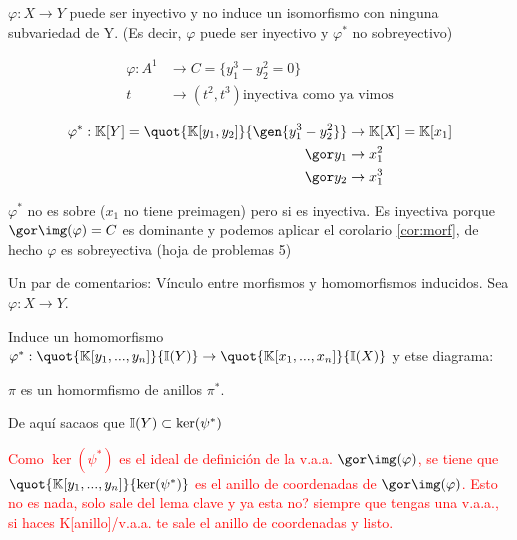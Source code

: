 \obs $\varphi: X \rightarrow Y$ puede ser inyectivo y no induce un isomorfismo con ninguna subvariedad de Y. (Es decir, $\varphi$ puede ser inyectivo y $\varphi^*$ no sobreyectivo)

\begin{example}

	\begin{align*}
		\varphi: A^1 & \rightarrow C=\{ y_1^3-y_2^2=0 \} \\
		t & \rightarrow (t^2,t^3) \text{inyectiva como ya vimos}
	\end{align*}

	\begin{align*}
		\varphi^*: \K[Y]=\quot{\K[y_1,y_2]}{\gen{y_1^3-y_2^2}} & \rightarrow \K[X]=\K[x_1] \\
		\cls{y_1} & \rightarrow x_1^2 \\
		\cls{y_2} & \rightarrow x_1^3
	\end{align*}

	$\varphi^*$ no es sobre ($x_1$ no tiene preimagen) pero si es inyectiva. Es inyectiva porque $\cls{\img(\varphi)}=C$  es dominante y podemos aplicar el corolario \ref{cor:morf}, de hecho $\varphi$ es sobreyectiva (hoja de problemas 5)
\end{example}

Un par de comentarios:
Vínculo entre morfismos y homomorfismos inducidos. Sea $\varphi:X \rightarrow Y$.

Induce un homomorfismo $\varphi^*: \quot{\K[y_1,...,y_n]}{\I(Y)} \rightarrow \quot{\K[x_1,...,x_n]}{\I(X)}$ y etse diagrama:


$\pi$ es un homormfismo de anillos $\pi^*$.

De aquí sacaos que $\mathbb{I}(Y) \subset \ker(\psi^*)$

\textcolor{red}{Como $\ker(\psi^*)$ es el ideal de definición de la v.a.a. $\cls{\img(\varphi)}$, se tiene que $\quot{\K[y_1,...,y_n]}{\ker(\psi^*)}$ es el anillo de coordenadas de $\cls{\img(\varphi)}$. Esto no es nada, solo sale del lema clave y ya esta no? siempre que tengas una v.a.a., si haces K[anillo]/v.a.a. te sale el anillo de coordenadas y listo.}

